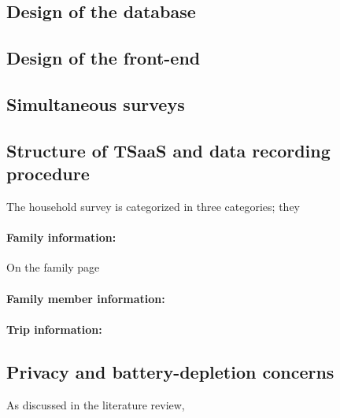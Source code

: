 \documentclass[12pt,authoryear]{elsarticle}
\begin{document}
\subsection{Design of the database}
\label{sec:db_design}
%


\subsection{Design of the front-end}
%

%
\subsection{Simultaneous surveys}
%

%
\subsection{Structure of TSaaS and data recording procedure}
%
The household survey is categorized in three categories; they

\paragraph{\textbf{Family information:}}

On the family page 

\paragraph{\textbf{Family member information:}}



\paragraph{\textbf{Trip information:}}



\subsection{Privacy and battery-depletion concerns}
As discussed in the literature review, 
\end{document}
